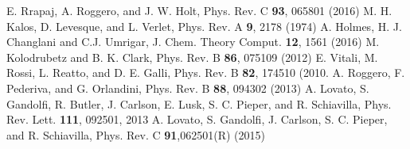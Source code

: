\begin{thebibliography}{99.}
E. Rrapaj, A. Roggero, and J. W. Holt, Phys. Rev. C {\bf 93}, 065801 (2016)
M. H. Kalos, D. Levesque, and L. Verlet,  Phys. Rev. A {\bf 9}, 2178 (1974)
A. Holmes, H. J. Changlani and C.J. Umrigar, J. Chem. Theory Comput. {\bf 12}, 1561 (2016)
M. Kolodrubetz and B. K. Clark, Phys. Rev. B {\bf 86}, 075109 (2012)
E. Vitali, M. Rossi, L. Reatto, and D. E. Galli,  Phys. Rev. B {\bf 82}, 174510 (2010.
A. Roggero, F. Pederiva, and G. Orlandini, Phys. Rev. B {\bf 88}, 094302 (2013)
A. Lovato, S. Gandolfi, R. Butler, J. Carlson, E. Lusk, S. C. Pieper, and R. Schiavilla,  Phys. Rev. Lett. {\bf 111}, 092501, 2013
A. Lovato, S. Gandolfi, J. Carlson, S. C. Pieper, and R. Schiavilla, Phys. Rev. C {\bf 91},062501(R) (2015)
\end{thebibliography}







